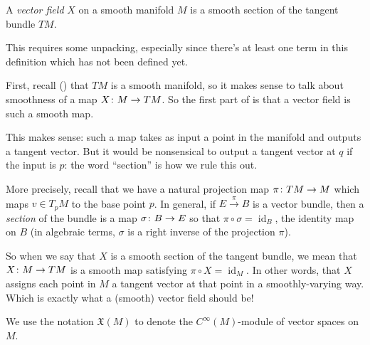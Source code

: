 \begin{definition}\label{def:vector field}
	A \emph{vector field} $X$ on a smooth manifold $M$ is a smooth section of the tangent bundle $TM$.
\end{definition}

This requires some unpacking, especially since there's at least one term in this definition which has not been defined yet.

First, recall () that $TM$ is a smooth manifold, so it makes sense to talk about smoothness of a map $X\colon\thinspace\! M \to TM$. So the first part of  is that a vector field is such a smooth map.

This makes sense: such a map takes as input a point in the manifold and outputs a tangent vector. But it would be nonsensical to output a tangent vector at $q$ if the input is $p$: the word ``section'' is how we rule this out.

More precisely, recall that we have a natural projection map $\pi \colon\thinspace\! TM \to M$ which maps $v \in T_p M$ to the base point $p$. In general, if $E \stackrel{\pi}{\to}B$ is a vector bundle, then a \emph{section} of the bundle is a map $\sigma\colon\thinspace\! B \to E$ so that $\pi \circ \sigma = \operatorname{id}_B$, the identity map on $B$ (in algebraic terms, $\sigma$ is a right inverse of the projection $\pi$).

So when we say that $X$ is a smooth section of the tangent bundle, we mean that $X \colon\thinspace\! M \to TM$ is a smooth map satisfying $\pi \circ X = \operatorname{id}_M$. In other words, that $X$ assigns each point in $M$ a tangent vector at that point in a smoothly-varying way. Which is exactly what a (smooth) vector field should be!

\begin{notation}
	We use the notation $\mathfrak{X}(M)$ to denote the $C^{\infty}(M)$-module of vector spaces on $M$.
\end{notation}

